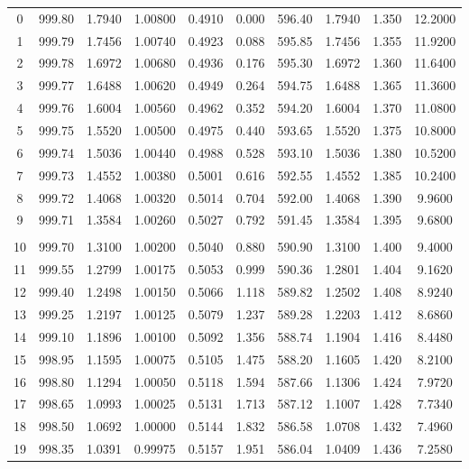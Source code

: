 \documentclass[letter,twosides,10pt]{article}
\begin{document}
\begin{longtable}{|c|c|c|c|c|c|c|c|c|c|}
  0 & 999.80 & 1.7940 & 1.00800 & 0.4910 &  0.000 & 596.40 & 1.7940 & 1.350 & 12.2000 \\
  1 & 999.79 & 1.7456 & 1.00740 & 0.4923 &  0.088 & 595.85 & 1.7456 & 1.355 & 11.9200 \\
  2 & 999.78 & 1.6972 & 1.00680 & 0.4936 &  0.176 & 595.30 & 1.6972 & 1.360 & 11.6400 \\
  3 & 999.77 & 1.6488 & 1.00620 & 0.4949 &  0.264 & 594.75 & 1.6488 & 1.365 & 11.3600 \\
  4 & 999.76 & 1.6004 & 1.00560 & 0.4962 &  0.352 & 594.20 & 1.6004 & 1.370 & 11.0800 \\
  5 & 999.75 & 1.5520 & 1.00500 & 0.4975 &  0.440 & 593.65 & 1.5520 & 1.375 & 10.8000 \\
  6 & 999.74 & 1.5036 & 1.00440 & 0.4988 &  0.528 & 593.10 & 1.5036 & 1.380 & 10.5200 \\
  7 & 999.73 & 1.4552 & 1.00380 & 0.5001 &  0.616 & 592.55 & 1.4552 & 1.385 & 10.2400 \\
  8 & 999.72 & 1.4068 & 1.00320 & 0.5014 &  0.704 & 592.00 & 1.4068 & 1.390 &  9.9600 \\
  9 & 999.71 & 1.3584 & 1.00260 & 0.5027 &  0.792 & 591.45 & 1.3584 & 1.395 &  9.6800 \\
 & & & & & & & & & \\ 
 10 & 999.70 & 1.3100 & 1.00200 & 0.5040 &  0.880 & 590.90 & 1.3100 & 1.400 &  9.4000 \\
 11 & 999.55 & 1.2799 & 1.00175 & 0.5053 &  0.999 & 590.36 & 1.2801 & 1.404 &  9.1620 \\
 12 & 999.40 & 1.2498 & 1.00150 & 0.5066 &  1.118 & 589.82 & 1.2502 & 1.408 &  8.9240 \\
 13 & 999.25 & 1.2197 & 1.00125 & 0.5079 &  1.237 & 589.28 & 1.2203 & 1.412 &  8.6860 \\
 14 & 999.10 & 1.1896 & 1.00100 & 0.5092 &  1.356 & 588.74 & 1.1904 & 1.416 &  8.4480 \\
 15 & 998.95 & 1.1595 & 1.00075 & 0.5105 &  1.475 & 588.20 & 1.1605 & 1.420 &  8.2100 \\
 16 & 998.80 & 1.1294 & 1.00050 & 0.5118 &  1.594 & 587.66 & 1.1306 & 1.424 &  7.9720 \\
 17 & 998.65 & 1.0993 & 1.00025 & 0.5131 &  1.713 & 587.12 & 1.1007 & 1.428 &  7.7340 \\
 18 & 998.50 & 1.0692 & 1.00000 & 0.5144 &  1.832 & 586.58 & 1.0708 & 1.432 &  7.4960 \\
 19 & 998.35 & 1.0391 & 0.99975 & 0.5157 &  1.951 & 586.04 & 1.0409 & 1.436 &  7.2580 \\

\end{longtable}
\end{document}
